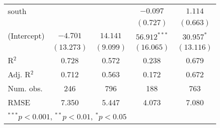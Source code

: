 \documentclass[12pt]{article}
\begin{document}
\begin{table}[H]
\begin{center}
\begin{tabular}{l c c c c }
			south                         &               &               & $-0.097$       & $1.114$       \\
			&               &               & $(0.727)$      & $(0.663)$     \\
			(Intercept)                   & $-4.701$      & $14.141$      & $56.912^{***}$ & $30.957^{*}$  \\
			& $(13.273)$    & $(9.099)$     & $(16.065)$     & $(13.116)$    \\
			\hline
			R$^2$                         & 0.728         & 0.572         & 0.238          & 0.679         \\
			Adj. R$^2$                    & 0.712         & 0.563         & 0.172          & 0.672         \\
			Num. obs.                     & 246           & 796           & 188            & 763           \\
			RMSE                          & 7.350         & 5.447         & 4.073          & 7.080         \\
			\hline
			\multicolumn{5}{l}{\scriptsize{$^{***}p<0.001$, $^{**}p<0.01$, $^*p<0.05$}}
		\end{tabular}
	\end{center}
\end{table}
\end{document}
